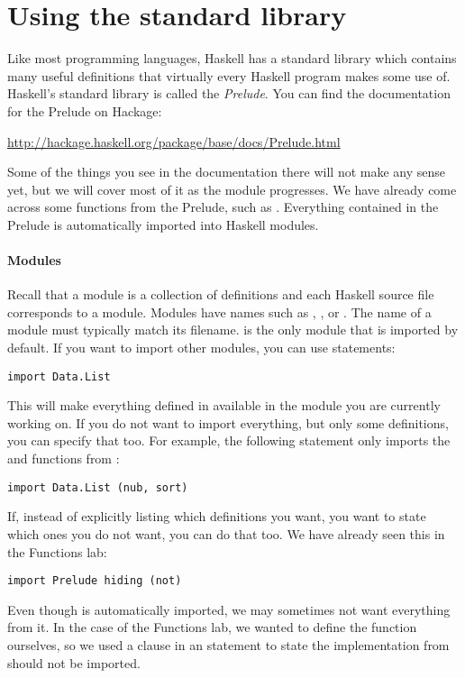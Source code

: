 \section{Using the standard library} \label{sec:lab-prelude}

Like most programming languages, Haskell has a standard library which contains many useful definitions that virtually every Haskell program makes some use of. Haskell's standard library is called the \emph{Prelude}. You can find the documentation for the Prelude on Hackage:
\begin{center}\small 
	\url{http://hackage.haskell.org/package/base/docs/Prelude.html}
\end{center}
Some of the things you see in the documentation there will not make any sense yet, but we will cover most of it as the module progresses. We have already come across some functions from the Prelude, such as . Everything contained in the Prelude is automatically imported into Haskell modules.

\paragraph{Modules} Recall that a module is a collection of definitions and each Haskell source file corresponds to a module. Modules have names such as , , or . The name of a module must typically match its filename.  is the only module that is imported by default. If you want to import other modules, you can use  statements:
\begin{verbatim}
import Data.List
\end{verbatim}
This will make everything defined in  available in the module you are currently working on. If you do not want to import everything, but only some definitions, you can specify that too. For example, the following  statement only imports the  and  functions from :
\begin{verbatim}
import Data.List (nub, sort)
\end{verbatim}
If, instead of explicitly listing which definitions you want, you want to state which ones you do not want, you can do that too. We have already seen this in the Functions lab:
\begin{verbatim}
import Prelude hiding (not)
\end{verbatim}
Even though  is automatically imported, we may sometimes not want everything from it. In the case of the Functions lab, we wanted to define the  function ourselves, so we used a  clause in an  statement to state the implementation from  should not be imported. 


